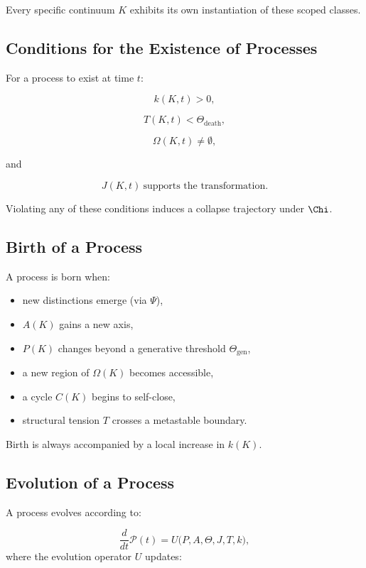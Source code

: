 Every specific continuum $K$ exhibits its own instantiation of these
scoped classes.

\subsection{Conditions for the Existence of Processes}

For a process to exist at time $t$:

\[
k(K,t) > 0,
\]

\[
T(K,t) < \Theta_{\mathrm{death}},
\]

\[
\Omega(K,t) \neq \emptyset,
\]

and

\[
J(K,t) \ \text{supports the transformation}.
\]

Violating any of these conditions induces a collapse trajectory under $\Chi$.

\subsection{Birth of a Process}

A process is born when:

\begin{itemize}
    \item new distinctions emerge (via $\Psi$),
    \item $A(K)$ gains a new axis,
    \item $P(K)$ changes beyond a generative threshold $\Theta_{\mathrm{gen}}$,
    \item a new region of $\Omega(K)$ becomes accessible,
    \item a cycle $C(K)$ begins to self-close,
    \item structural tension $T$ crosses a metastable boundary.
\end{itemize}

Birth is always accompanied by a local increase in $k(K)$.

\subsection{Evolution of a Process}

A process evolves according to:

\[
\frac{d}{dt}\mathcal{P}(t) 
= U\bigl(P, A, \Theta, J, T, k\bigr),
\]
where the evolution operator $U$ updates:

